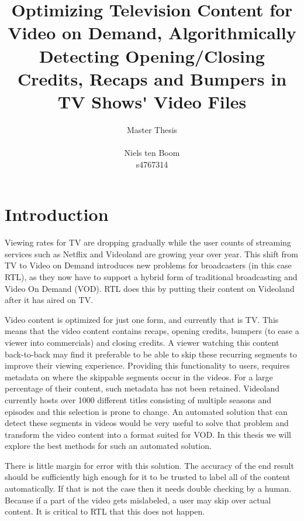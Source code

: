 \documentclass{article}
\begin{document}
\title{Optimizing Television Content for Video on Demand, Algorithmically Detecting Opening/Closing Credits, Recaps and Bumpers in TV Shows\'{} Video Files}
\author{Master Thesis\\ \\ Niels ten Boom  \\ s4767314}

\date{\vspace{-3ex}}

\maketitle
\newpage

\tableofcontents
\newpage

\section{Introduction}
Viewing rates for TV are dropping gradually while the user counts of streaming services such as Netflix and Videoland are growing year over year. This shift from TV to Video on Demand introduces new problems for broadcasters (in this case RTL), as they now have to support a hybrid form of traditional broadcasting and Video On Demand (VOD). RTL does this by putting their content on Videoland after it has aired on TV. 

Video content is optimized for just one form, and currently that is TV. This means that the video content contains recaps, opening credits, bumpers (to ease a viewer into commercials) and closing credits. A viewer watching this content back-to-back may find it preferable to be able to skip these recurring segments to improve their viewing experience. Providing this functionality to users, requires metadata on where the skippable segments occur in the videos. For a large percentage of their content, such metadata has not been retained. Videoland currently hosts over 1000 different titles consisting of multiple seasons and episodes and this selection is prone to change. An automated solution that can detect these segments in videos would be very useful to solve that problem and transform the video content into a format suited for VOD. In this thesis we will explore the best methods for such an automated solution. 

There is little margin for error with this solution. The accuracy of the end result should be sufficiently high enough for it to be trusted to label all of the content automatically. If that is not the case then it needs double checking by a human. Because if a part of the video gets mislabeled, a user may skip over actual content. It is critical to RTL that this does not happen.
\end{document}
